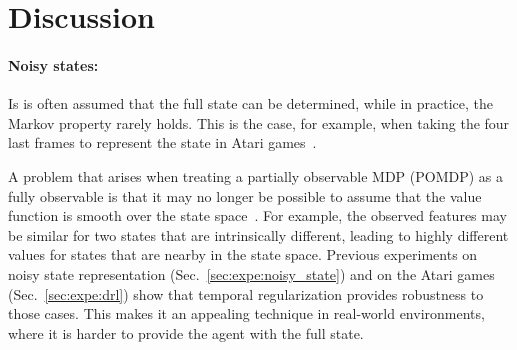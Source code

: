 \section{Discussion}

\paragraph{Noisy states:}

Is is often assumed that the full state can be determined, while in practice, the Markov property rarely holds. This is the case, for example, when taking the four last frames to represent the state in Atari games~\cite{mnih2015human}. 

A problem that arises when treating a partially observable MDP (POMDP) as a fully observable is that it may no longer be possible to assume that the value function is smooth over the state space~\cite{singh1994learning}.
For example, the observed features may be similar for two states that are intrinsically different, leading to highly different values for states that are nearby in the state space. Previous experiments on noisy state representation (Sec.~\ref{sec:expe:noisy_state}) and on the Atari games (Sec.~\ref{sec:expe:drl}) show that temporal regularization provides robustness to those cases. This makes it an appealing technique in real-world environments, where it is harder to provide the agent with the full state.
